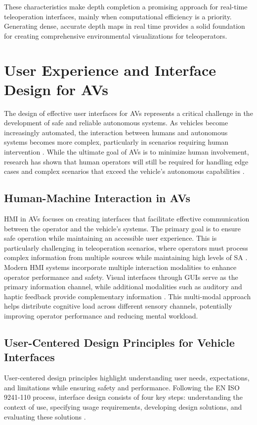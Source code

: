 These characteristics make depth completion a promising approach for real-time teleoperation interfaces, mainly when computational efficiency is a priority. Generating dense, accurate depth maps in real time provides a solid foundation for creating comprehensive environmental visualizations for teleoperators.

\section{User Experience and Interface Design for \acp{AV}}
The design of effective user interfaces for \acp{AV} represents a critical challenge in the development of safe and reliable autonomous systems. As vehicles become increasingly automated, the interaction between humans and autonomous systems becomes more complex, particularly in scenarios requiring human intervention \cite{Kettwich}. While the ultimate goal of \acp{AV} is to minimize human involvement, research has shown that human operators will still be required for handling edge cases and complex scenarios that exceed the vehicle's autonomous capabilities \cite{mutzenich2021updating}.
\subsection{Human-Machine Interaction in \acp{AV}}
\ac{HMI} in \acp{AV} focuses on creating interfaces that facilitate effective communication between the operator and the vehicle's systems. The primary goal is to ensure safe operation while maintaining an accessible user experience. This is particularly challenging in teleoperation scenarios, where operators must process complex information from multiple sources while maintaining high levels of \ac{SA} \cite{Georg}.
Modern HMI systems incorporate multiple interaction modalities to enhance operator performance and safety. Visual interfaces through \acp{GUI} serve as the primary information channel, while additional modalities such as auditory and haptic feedback provide complementary information \cite{kallioniemi2021enhancing}. This multi-modal approach helps distribute cognitive load across different sensory channels, potentially improving operator performance and reducing mental workload.
\subsection{User-Centered Design Principles for Vehicle Interfaces}
User-centered design principles highlight understanding user needs, expectations, and limitations while ensuring safety and performance. Following the EN ISO 9241-110 process, interface design consists of four key steps: understanding the context of use, specifying usage requirements, developing design solutions, and evaluating these solutions \cite{Georg}.

